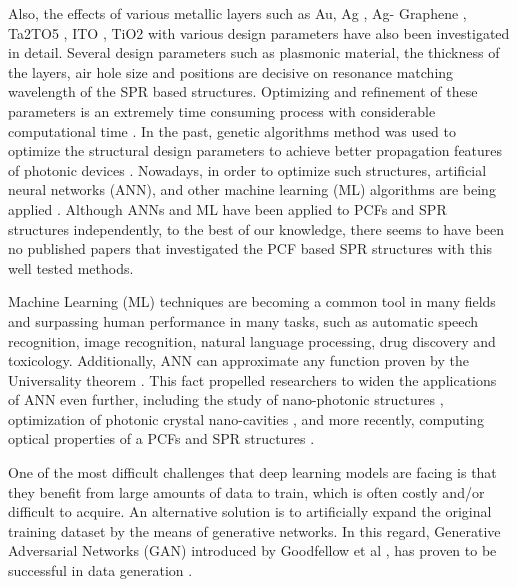 \documentclass[journal]{IEEEtran}
\begin{document}
Also, the effects of various metallic layers such as Au, Ag \cite{yasli2019multi}, Ag- Graphene \cite{rifat2016highly}, Ta2TO5 \cite{otupiri2015multi}, ITO \cite{dash2014spr}, TiO2 \cite{rifat2016highly} with various design parameters have also been investigated in detail. Several design parameters such as plasmonic material, the thickness of the layers, air hole size and positions are decisive on resonance matching wavelength of the SPR based structures. Optimizing and refinement of these parameters is an extremely time consuming process with considerable computational time \cite{fornarelli2009neural,abdelaziz2012photonic,paper0}. In the past, genetic algorithms \cite{abdelaziz2012photonic,borel2004topology} method was used to optimize the structural design parameters to achieve better propagation features of photonic devices \cite{rifat2016highly}. Nowadays, in order to optimize such structures, artificial neural networks (ANN), and other machine learning (ML) algorithms are being applied \cite{fornarelli2009neural,paper0,hameed2008accurate}. Although ANNs and ML have been applied to PCFs \cite{fornarelli2009neural,paper0} and SPR structures \cite{fu2018optimization,mcatee2019artificial} independently, to the best of our knowledge, there seems to have been no published papers that investigated the PCF based SPR structures with this well tested methods.


Machine Learning (ML) techniques are becoming a common tool in many fields and surpassing human performance in many tasks, such as automatic speech recognition, image recognition, natural language processing, drug discovery and toxicology. Additionally, ANN can approximate any function proven by the Universality theorem  \cite{HORNIK1991251}. This fact propelled researchers to widen the applications of ANN even further, including the study of nano-photonic structures   \cite{kiarashinejad2020knowledge}, optimization of photonic crystal nano-cavities \cite{asano2018optimization}, and more recently, computing optical properties of a PCFs  \cite{paper0} and SPR structures \cite{fu2018optimization,mcatee2019artificial}.

One of the most difficult challenges that deep learning models are facing is that they benefit from large amounts of data to train, which is often costly and/or difficult to acquire. An alternative solution is to artificially expand the original training dataset by the means of generative networks. In this regard, Generative Adversarial Networks (GAN) introduced by Goodfellow et al  \cite{goodfellow2014generative}, has proven to be successful in data generation  \cite{schlegl2017unsupervised,  frid2018synthetic,  perez2017effectiveness}.
\end{document}
